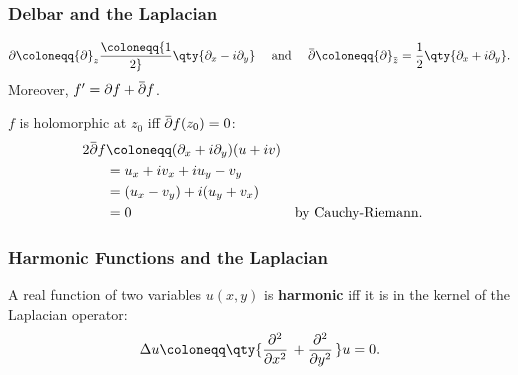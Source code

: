 
\hypertarget{delbar-and-the-laplacian}{%
\subsubsection{Delbar and the
Laplacian}\label{delbar-and-the-laplacian}}

\begin{definition}

\begin{align*}
{\partial}\coloneqq{\partial}_z \coloneqq{1\over 2}\qty{{\partial}_x - i {\partial}_y}
\quad
\text{ and }
\quad
\mkern 1.5mu\overline{\mkern-1.5mu{\partial}\mkern-1.5mu}\mkern 1.5mu
\coloneqq{\partial}_{\mkern 1.5mu\overline{\mkern-1.5muz\mkern-1.5mu}\mkern 1.5mu}
={1\over 2}\qty{ {\partial}_x + i{\partial}_y}
.\end{align*}
Moreover,
\(f' = {\partial}f + \mkern 1.5mu\overline{\mkern-1.5mu{\partial}\mkern-1.5mu}\mkern 1.5muf\).

\end{definition}

\begin{proposition}

\(f\) is holomorphic at \(z_0\) iff
\(\mkern 1.5mu\overline{\mkern-1.5mu{\partial}\mkern-1.5mu}\mkern 1.5muf(z_0) = 0\):
\begin{align*}
2\mkern 1.5mu\overline{\mkern-1.5mu{\partial}\mkern-1.5mu}\mkern 1.5muf 
&\coloneqq({\partial}_x + i {\partial}_y) (u+iv) \\
&= u_x + iv_x + iu_y - v_y \\
&= (u_x - v_y) + i(u_y + v_x) \\
&= 0 && \text{by Cauchy-Riemann}
.\end{align*}

\end{proposition}

\hypertarget{harmonic-functions-and-the-laplacian}{%
\subsubsection{Harmonic Functions and the
Laplacian}\label{harmonic-functions-and-the-laplacian}}

\begin{definition}

A real function of two variables \(u(x, y)\) is \textbf{harmonic} iff it
is in the kernel of the Laplacian operator:
\begin{align*}  
\Delta u \coloneqq\qty{{\frac{\partial ^2}{\partial x^2}\,} + {\frac{\partial ^2}{\partial y^2}\,}}u = 0
.\end{align*}

\end{definition}

